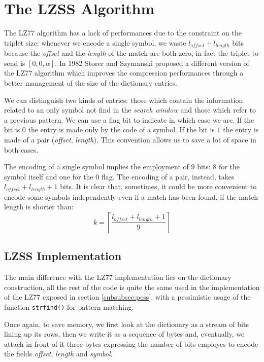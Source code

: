 \section{The LZSS Algorithm}
The LZ77 algorithm has a lack of performances due to the constraint on the triplet size: whenever we encode a single symbol, we waste $l_{offset} + l_{length}$ bits because the \textit{offset} and the \textit{length} of the match are both zero, in fact the triplet to send is $[0, 0, \alpha]$. In 1982 Storer and Szymanski \cite{storer1} proposed a different version of the LZ77 algorithm which improves the compression performances through a better management of the size of the dictionary entries.

We can distinguish two kinds of entries: those which contain the information related to an only symbol not find in the \textit{search window} and those which refer to a previous pattern. We can use a flag bit to indicate in which case we are. If the bit is $0$ the entry is made only by the code of a symbol. If the bit is $1$ the entry is made of a pair (\textit{offset}, \textit{length}). This convention allows us to save a lot of space in both cases.

The encoding of a single symbol implies the employment of $9$ bits: $8$ for the symbol itself and one for the $0$ flag. The encoding of a pair, instead, takes $l_{offset} + l_{length} + 1$ bits. It is clear that, sometimes, it could be more convenient to encode some symbols independently even if a match has been found, if the match length is shorter than:
\begin{equation}
k = \left \lceil \frac{l_{offset} + l_{length} + 1}{9} \right \rceil
\end{equation}

\subsection{LZSS Implementation}
The main difference with the LZ77 implementation lies on the dictionary construction, all the rest of the code is quite the same used in the implementation of the LZ77 exposed in section \ref{subsubsec:pess}, with a pessimistic usage of the function \texttt{strfind()} for pattern matching.

Once again, to save memory, we first look at the dictionary as a stream of bits lining up its rows, then we write it as a sequence of bytes and, eventually, we attach in front of it three bytes expressing the number of bits employes to encode the fields \textit{offset}, \textit{length} and \textit{symbol}.